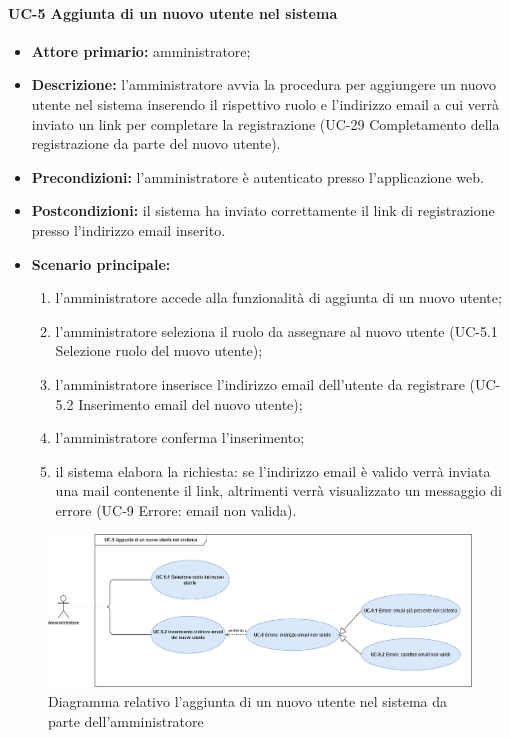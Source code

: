 \paragraph{UC-5 Aggiunta di un nuovo utente nel sistema}
\begin{itemize}
    \item \textbf{Attore primario:} amministratore; 

    \item \textbf{Descrizione:} l'amministratore avvia la procedura per aggiungere un nuovo utente nel sistema inserendo il rispettivo ruolo e l'indirizzo email a cui verrà inviato un link per completare la registrazione (UC-29 Completamento della registrazione da parte del nuovo utente).

    \item \textbf{Precondizioni:} l'amministratore è  autenticato presso l'applicazione web.

    \item \textbf{Postcondizioni:} il sistema ha inviato correttamente il link di registrazione presso l'indirizzo email inserito.

    \item \textbf{Scenario principale:}
          \begin{enumerate}
              \item l'amministratore accede alla funzionalità di aggiunta di un nuovo utente;
              \item l'amministratore seleziona il ruolo da assegnare al nuovo utente (UC-5.1 Selezione ruolo del nuovo utente);
              \item l'amministratore inserisce l'indirizzo email dell'utente da registrare (UC-5.2 Inserimento email del nuovo utente);
              \item l'amministratore conferma l'inserimento;
              \item il sistema elabora la richiesta: se l'indirizzo email è valido verrà inviata una mail contenente il link, altrimenti verrà visualizzato un messaggio di errore (UC-9 Errore: email non valida).
          \end{enumerate}
\end{itemize}
\begin{figure}[H]
    \centering
      \includegraphics[scale=0.35]{src/CasiDUso/immagini/NuovoUtenteAdmin.png}
    \caption{Diagramma relativo l'aggiunta di un nuovo utente nel sistema da parte dell'amministratore}
\end{figure}

